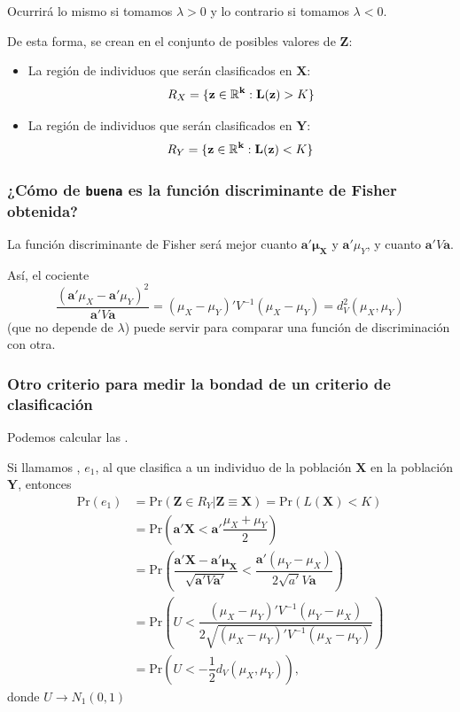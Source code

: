 Ocurrirá lo mismo si tomamos $\lambda>0$ y lo contrario si tomamos $\lambda<0$.

De esta forma, se crean  en el conjunto de posibles valores de $\mathbf{Z}$:
\begin{itemize}
	\item La región de individuos que serán clasificados en $\mathbf{X}$: 
	\[R_X=\{\mathbf{z\in\operatorname{\mathbb{R}}^k:L(\mathbf{z})}>K\}  \]
	\item La región de individuos que serán clasificados en $\mathbf{Y}$:
	\[R_Y=\{\mathbf{z\in\operatorname{\mathbb{R}}^k:L(\mathbf{z})}<K\}  \]
\end{itemize}
\subsubsection{¿Cómo de \textbf{\texttt{buena}} es la función discriminante de Fisher obtenida?}
La función discriminante de Fisher será mejor cuanto  $\mathbf{a'\mu_X}$ y $\mathbf{a'}\mu_Y$, y cuanto  $\mathbf{a'}V\mathbf{a}$.

Así, el cociente \[ \dfrac{(\mathbf{a'}\mu_X-\mathbf{a'}\mu_Y)^2}{\mathbf{a'}V\mathbf{a}}=(\mu_X-\mu_Y)'V^{-1}(\mu_X-\mu_Y)=d_V^2(\mu_X,\mu_Y) \](que no depende de $\lambda$) puede servir para comparar una función de discriminación con otra.

\subsubsection{Otro criterio para medir la bondad de un criterio de clasificación}
Podemos calcular las .

Si llamamos , $e_1$, al que clasifica a un individuo de la población $\mathbf{X}$ en la población $\mathbf{Y}$, entonces \begin{align*}
	\mathrm{Pr}(e_1)&=\mathrm{Pr}(\mathbf{Z}\in R_Y|\mathbf{Z\equiv X})=\mathrm{Pr}(L(\mathbf{X})<K)\\
	&=\mathrm{Pr}\left(\mathbf{a'X}<\mathbf{a'}\dfrac{\mu_X+\mu_Y}{2}\right)\\
	&=\mathrm{Pr}\left(\dfrac{\mathbf{a'X-a'\mu_X}}{\sqrt{\mathbf{a'}V\mathbf{a'}}}<\dfrac{\mathbf{a'}(\mu_Y-\mu_X)}{2\sqrt{a'}V\mathbf{a}}\right)\\
	&=\mathrm{Pr}\left(U<\dfrac{(\mu_X-\mu_Y)'V^{-1}(\mu_Y-\mu_X)}{2\sqrt{(\mu_X-\mu_Y)'V^{-1}(\mu_X-\mu_Y)}}\right)\\
	&=\mathrm{Pr}\left(U<-\dfrac{1}{2}d_V(\mu_X,\mu_Y)\right),
\end{align*}donde $U\longrightarrow N_1(0,1)$

